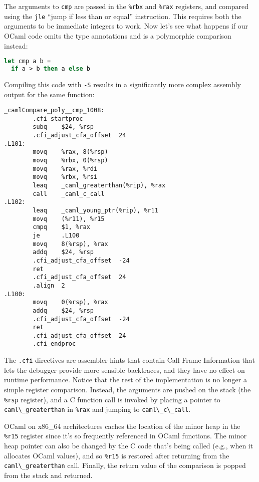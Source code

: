 The arguments to \passthrough{\lstinline!cmp!} are passed in the
\passthrough{\lstinline!\%rbx!} and \passthrough{\lstinline!\%rax!}
registers, and compared using the \passthrough{\lstinline!jle!} ``jump
if less than or equal'' instruction. This requires both the arguments to
be immediate integers to work. Now let's see what happens if our OCaml
code omits the type annotations and is a polymorphic comparison instead:

\begin{lstlisting}[language=Caml]
let cmp a b =
  if a > b then a else b
\end{lstlisting}

Compiling this code with \passthrough{\lstinline!-S!} results in a
significantly more complex assembly output for the same function:

\begin{lstlisting}
_camlCompare_poly__cmp_1008:
        .cfi_startproc
        subq    $24, %rsp
        .cfi_adjust_cfa_offset  24
.L101:
        movq    %rax, 8(%rsp)
        movq    %rbx, 0(%rsp)
        movq    %rax, %rdi
        movq    %rbx, %rsi
        leaq    _caml_greaterthan(%rip), %rax
        call    _caml_c_call
.L102:
        leaq    _caml_young_ptr(%rip), %r11
        movq    (%r11), %r15
        cmpq    $1, %rax
        je      .L100
        movq    8(%rsp), %rax
        addq    $24, %rsp
        .cfi_adjust_cfa_offset  -24
        ret
        .cfi_adjust_cfa_offset  24
        .align  2
.L100:
        movq    0(%rsp), %rax
        addq    $24, %rsp
        .cfi_adjust_cfa_offset  -24
        ret
        .cfi_adjust_cfa_offset  24
        .cfi_endproc
\end{lstlisting}

The \passthrough{\lstinline!.cfi!} directives are assembler hints that
contain Call Frame Information that lets the debugger provide more
sensible backtraces, and they have no effect on runtime performance.
Notice that the rest of the implementation is no longer a simple
register comparison. Instead, the arguments are pushed on the stack (the
\passthrough{\lstinline!\%rsp!} register), and a C function call is
invoked by placing a pointer to
\passthrough{\lstinline!caml\_greaterthan!} in
\passthrough{\lstinline!\%rax!} and jumping to
\passthrough{\lstinline!caml\_c\_call!}. 

OCaml on x86\_64 architectures caches the location of the minor heap in
the \passthrough{\lstinline!\%r15!} register since it's so frequently
referenced in OCaml functions. The minor heap pointer can also be
changed by the C code that's being called (e.g., when it allocates OCaml
values), and so \passthrough{\lstinline!\%r15!} is restored after
returning from the \passthrough{\lstinline!caml\_greaterthan!} call.
Finally, the return value of the comparison is popped from the stack and
returned.

